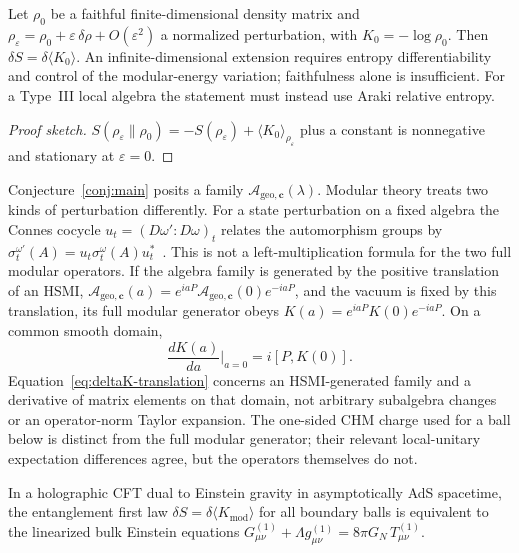 \begin{theorem}
\label{thm:first-law}
Let $\rho_0$ be a faithful finite-dimensional density matrix and
$\rho_\varepsilon=\rho_0+\varepsilon\,\delta\rho+O(\varepsilon^2)$ a normalized
perturbation, with $K_0=-\log\rho_0$. Then $\delta S=\delta\langle K_0\rangle$.
An infinite-dimensional extension requires entropy differentiability and control
of the modular-energy variation; faithfulness alone is insufficient. For a Type~III
local algebra the statement must instead use Araki relative entropy.
\end{theorem}

\begin{proof}[Proof sketch]
$S(\rho_\varepsilon\|\rho_0)=-S(\rho_\varepsilon)+\langle K_0\rangle_{\rho_\varepsilon}$ plus a constant is nonnegative and stationary at $\varepsilon=0$.
\end{proof}

Conjecture~\ref{conj:main} posits a family $\mathcal{A}_{\mathrm{geo},\mathbf{c}}(\lambda)$. Modular theory treats two kinds of perturbation differently. For a state perturbation on a fixed algebra the Connes cocycle $u_t=(D\omega':D\omega)_t$ relates the automorphism groups by
$\sigma_t^{\omega'}(A)=u_t\sigma_t^\omega(A)u_t^*$~\cite{Connes1994,Takesaki2003}. This is not a left-multiplication formula for the two full modular operators. If the algebra family is generated by the positive translation of an HSMI,
$\mathcal A_{\mathrm{geo},\mathbf c}(a)=e^{iaP}\mathcal A_{\mathrm{geo},\mathbf c}(0)e^{-iaP}$,
and the vacuum is fixed by this translation, its full modular generator obeys
$K(a)=e^{iaP}K(0)e^{-iaP}$. On a common smooth domain,
\begin{equation}
\label{eq:deltaK-translation}
\frac{dK(a)}{da}\Big|_{a=0}=i[P,K(0)] .
\end{equation}
Equation~\eqref{eq:deltaK-translation} concerns an HSMI-generated family and a derivative
of matrix elements on that domain, not arbitrary subalgebra changes or an operator-norm
Taylor expansion. The one-sided CHM charge used for a ball below is distinct from the
full modular generator; their relevant local-unitary expectation differences agree,
but the operators themselves do not.

\begin{theorem}
\label{thm:linearized-Faulkner}
In a holographic CFT dual to Einstein gravity in asymptotically AdS spacetime, the entanglement first law $\delta S = \delta\langle K_{\mathrm{mod}}\rangle$ for all boundary balls is equivalent to the linearized bulk Einstein equations $G_{\mu\nu}^{(1)} + \Lambda g_{\mu\nu}^{(1)} = 8\pi G_N\, T_{\mu\nu}^{(1)}$.
\end{theorem}

